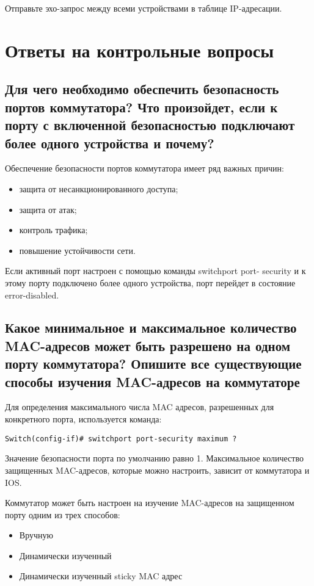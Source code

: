 Отправьте эхо-запрос между всеми устройствами в таблице IP-адресации.

\section{Ответы на контрольные вопросы}

\subsection{Для чего необходимо обеспечить безопасность портов
коммутатора? Что произойдет, если к порту с включенной
безопасностью подключают более одного устройства и почему?}

Обеспечение безопасности портов коммутатора имеет ряд важных
причин:

\begin{itemize}
    \item защита от несанкционированного доступа;
    \item защита от атак;
    \item контроль трафика;
    \item повышение устойчивости сети.
\end{itemize}

Если активный порт настроен с помощью команды switchport port-
security и к этому порту подключено более одного устройства, порт перейдет
в состояние error-disabled.

\subsection{Какое минимальное и максимальное количество MAC-адресов
может быть разрешено на одном порту коммутатора? Опишите
все существующие способы изучения MAC-адресов на
коммутаторе}

Для определения максимального числа MAC адресов, разрешенных для
конкретного порта, используется команда:

\begin{verbatim}
Switch(config-if)# switchport port-security maximum ?
\end{verbatim}

Значение безопасности порта по умолчанию равно 1. Максимальное
количество защищенных MAC-адресов, которые можно настроить, зависит
от коммутатора и IOS.

Коммутатор может быть настроен на изучение MAC-адресов на
защищенном порту одним из трех способов:

\begin{itemize}
    \item Вручную
    \item Динамически изученный
    \item Динамически изученный sticky MAC адрес
\end{itemize}

